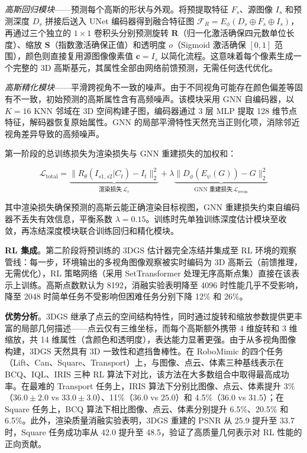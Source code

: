 \textit{高斯回归模块}——预测每个高斯的形状与外观。将预提取特征 $F_s$、源图像 $I_s$ 和预测深度 $D_s$ 拼接后送入 UNet 编码器得到融合特征图 $\mathcal{F}_R = E_\phi(D_s \oplus F_s \oplus I_s)$，再通过三个独立的 $1\times1$ 卷积头分别预测旋转 $\mathbf{R}$（归一化激活确保四元数单位长度）、缩放 $\mathbf{S}$（指数激活确保正值）和透明度 $o$（Sigmoid 激活确保 $[0,1]$ 范围），颜色则直接复用源图像像素值 $\mathbf{c} = I_s$ 以简化流程。这意味着每个像素生成一个完整的 3D 高斯基元，其属性全部由网络前馈预测，无需任何迭代优化。

\textit{高斯精化模块}——平滑跨视角不一致的噪声。由于不同视角可能存在颜色偏差等固有不一致，初始预测的高斯属性含有高频噪声。该模块采用 GNN 自编码器，以 $K=16$ KNN 邻域在 3D 空间构建子图，编码器通过 3 层 MLP 提取 128 维节点特征，解码器恢复原始属性。GNN 的局部平滑特性天然充当正则化项，消除邻近视角差异导致的高频噪声。

第一阶段的总训练损失为渲染损失与 GNN 重建损失的加权和：

\begin{equation}
\mathcal{L}_\text{total} = \underbrace{\|R_\theta(I_{s1,s2}|C_t) - I_t\|_2^2}_{\text{渲染损失}\,\mathcal{L}_r} + \lambda \underbrace{\|D_\phi(E_\psi(G)) - G\|_2^2}_{\text{GNN 重建损失}\,\mathcal{L}_\text{recon}}
\end{equation}

其中渲染损失确保预测的高斯云能正确渲染目标视图，GNN 重建损失约束自编码器不丢失有效信息，平衡系数 $\lambda=0.15$。训练时先单独训练深度估计模块至收敛，再冻结深度模块联合训练回归和精化模块。

\textbf{RL 集成}。第二阶段将预训练的 3DGS 估计器完全冻结并集成至 RL 环境的观察管线：每一步，环境输出的多视角图像观察被实时编码为 3D 高斯云（前馈推理，无需优化），RL 策略网络（采用 SetTransformer 处理无序高斯点集）直接在该表示上训练。高斯点数默认为 8192，消融实验表明降至 4096 时性能几乎不受影响，降至 2048 时简单任务不受影响但困难任务分别下降 12\% 和 26\%。

\textbf{优势分析}。3DGS 继承了点云的空间结构特性，同时通过旋转和缩放参数提供更丰富的局部几何描述——点云仅有三维坐标，而每个高斯额外携带 4 维旋转和 3 维缩放，共 14 维属性（含颜色和透明度），表达能力显著更强。由于从多视角图像构建，3DGS 天然具有 3D 一致性和遮挡鲁棒性。在 RoboMimic 的四个任务（Lift、Can、Square、Transport）上，与图像、点云、体素三种基线表示在 BCQ、IQL、IRIS 三种 RL 算法下对比，该方法在大多数组合中取得最高成功率。在最难的 Transport 任务上，IRIS 算法下分别比图像、点云、体素提升 3\%（$36.0 \pm 2.0$ vs $33.0 \pm 3.0$）、11\%（$36.0$ vs $25.0$）和 4.5\%（$36.0$ vs $31.5$）；在 Square 任务上，BCQ 算法下相比图像、点云、体素分别提升 6.5\%、20.5\% 和 6.5\%。此外，渲染质量消融实验表明，3DGS 重建的 PSNR 从 25.9 提升至 33.7 时，Square 任务成功率从 42.0 提升至 48.5，验证了高质量几何表示对 RL 性能的正向贡献。


